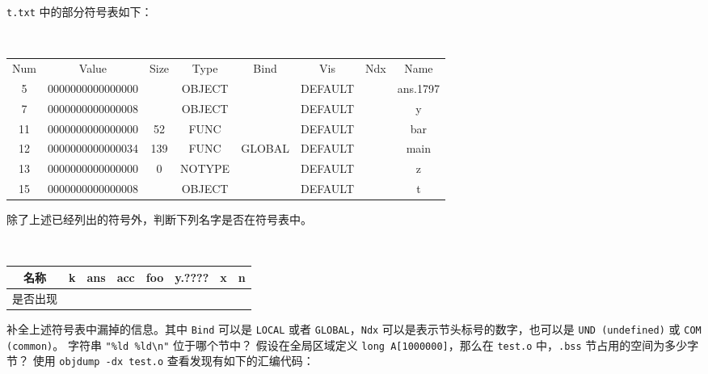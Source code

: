 \begin{problems}
        \verb|t.txt| 中的部分符号表如下：
        \begin{table}[H]
            \tt
            \centering
            \begin{tabular}{cccccccc}
                \hline
                \multicolumn{1}{|c}{Num} & Value & Size & Type & Bind & Vis & Ndx & \multicolumn{1}{c|}{Name} \\
                \multicolumn{1}{|c}{5} & 0000000000000000 &  & OBJECT &  & DEFAULT &  & \multicolumn{1}{c|}{ans.1797} \\
                \multicolumn{1}{|c}{7} & 0000000000000008 &  & OBJECT &  & DEFAULT &  & \multicolumn{1}{c|}{y} \\
                \multicolumn{1}{|c}{11} & 0000000000000000 & 52 & FUNC &  & DEFAULT &  & \multicolumn{1}{c|}{bar} \\
                \multicolumn{1}{|c}{12} & 0000000000000034 & 139 & FUNC & GLOBAL & DEFAULT &  & \multicolumn{1}{c|}{main} \\
                \multicolumn{1}{|c}{13} & 0000000000000000 & 0 & NOTYPE &  & DEFAULT &  & \multicolumn{1}{c|}{z} \\
                \multicolumn{1}{|c}{15} & 0000000000000008 &  & OBJECT &  & DEFAULT &  & \multicolumn{1}{c|}{t} \\ \hline
            \end{tabular}
        \end{table}
        \qn 除了上述已经列出的符号外，判断下列名字是否在符号表中。
        \begin{table}[H]
            \tt
            \centering
            \begin{tabular}{|c|c|c|c|c|c|c|c|}
                \hline
                名称 & k & ans & acc & foo & y.???? & x & n \\ \hline
                是否出现 & {\qquad \qquad} & {\qquad \qquad} & {\qquad \qquad} & {\qquad \qquad} & {\qquad \qquad} & {\qquad \qquad} & {\qquad \qquad} \\ \hline
            \end{tabular}
        \end{table}
        \qn 补全上述符号表中漏掉的信息。其中 \verb|Bind| 可以是 \verb|LOCAL| 或者 \verb|GLOBAL|，\verb|Ndx| 可以是表示节头标号的数字，也可以是 \verb|UND (undefined)| 或 \verb|COM (common)|。
        \qn 字符串 \verb|"%ld %ld\n"| 位于哪个节中？
        \qn 假设在全局区域定义 \verb|long A[1000000]|，那么在 \verb|test.o| 中，\verb|.bss| 节占用的空间为多少字节？
        \qn 使用 \verb|objdump -dx test.o| 查看发现有如下的汇编代码：

\end{problems}
